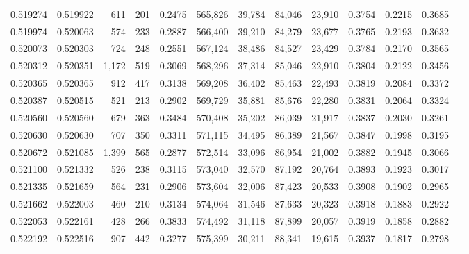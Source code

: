 \begin{tabular}{rrrrrrrrrrrrr}
0.519274 & 0.519922 &   611 &   201 &                                     0.2475 & 565,826 &  39,784 &  84,046 &  23,910 & 0.3754 & 0.2215 & 0.3685 \\
0.519974 & 0.520063 &   574 &   233 &                                     0.2887 & 566,400 &  39,210 &  84,279 &  23,677 & 0.3765 & 0.2193 & 0.3632 \\
0.520073 & 0.520303 &   724 &   248 &                                     0.2551 & 567,124 &  38,486 &  84,527 &  23,429 & 0.3784 & 0.2170 & 0.3565 \\
0.520312 & 0.520351 & 1,172 &   519 &                                     0.3069 & 568,296 &  37,314 &  85,046 &  22,910 & 0.3804 & 0.2122 & 0.3456 \\
0.520365 & 0.520365 &   912 &   417 &                                     0.3138 & 569,208 &  36,402 &  85,463 &  22,493 & 0.3819 & 0.2084 & 0.3372 \\
0.520387 & 0.520515 &   521 &   213 &                                     0.2902 & 569,729 &  35,881 &  85,676 &  22,280 & 0.3831 & 0.2064 & 0.3324 \\
0.520560 & 0.520560 &   679 &   363 &                                     0.3484 & 570,408 &  35,202 &  86,039 &  21,917 & 0.3837 & 0.2030 & 0.3261 \\
0.520630 & 0.520630 &   707 &   350 &                                     0.3311 & 571,115 &  34,495 &  86,389 &  21,567 & 0.3847 & 0.1998 & 0.3195 \\
0.520672 & 0.521085 & 1,399 &   565 &                                     0.2877 & 572,514 &  33,096 &  86,954 &  21,002 & 0.3882 & 0.1945 & 0.3066 \\
0.521100 & 0.521332 &   526 &   238 &                                     0.3115 & 573,040 &  32,570 &  87,192 &  20,764 & 0.3893 & 0.1923 & 0.3017 \\
0.521335 & 0.521659 &   564 &   231 &                                     0.2906 & 573,604 &  32,006 &  87,423 &  20,533 & 0.3908 & 0.1902 & 0.2965 \\
0.521662 & 0.522003 &   460 &   210 &                                     0.3134 & 574,064 &  31,546 &  87,633 &  20,323 & 0.3918 & 0.1883 & 0.2922 \\
0.522053 & 0.522161 &   428 &   266 &                                     0.3833 & 574,492 &  31,118 &  87,899 &  20,057 & 0.3919 & 0.1858 & 0.2882 \\
0.522192 & 0.522516 &   907 &   442 &                                     0.3277 & 575,399 &  30,211 &  88,341 &  19,615 & 0.3937 & 0.1817 & 0.2798 \\

\end{tabular}
